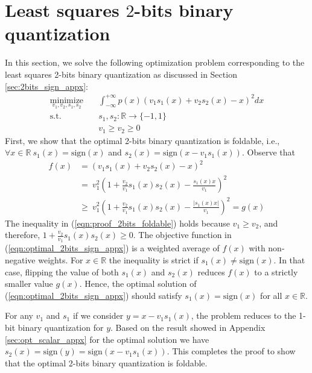 \documentclass[10pt,twocolumn,letterpaper]{article}
\newcommand{\R}{\mathbb{R}}
\begin{document}
\section{Least squares $2$-bits binary quantization} \label{sec:optimal_2bits}
In this section, we solve the following optimization problem corresponding to the least squares 2-bits binary quantization as discussed in Section \ref{sec:2bits_sign_appx}:
\begin{equation}\label{eqn:optimal_2bits_sign_appx}
\begin{aligned}
\underset{v_1,v_2, s_1,s_2}{\text{minimize}} \quad & \int_{-\infty}^{+\infty} p(x)\left(v_1 s_1(x) + v_2 s_2(x)  - x\right)^2 dx\\
\text{s.t.} \quad &s_1, s_2: \R \to \{-1,1\}\\
\quad & v_1 \ge v_2\ge 0
\end{aligned}
\end{equation}
First, we show that the optimal 2-bits binary quantization is foldable, i.e., $\forall x\in \R~ s_1(x) = \text{sign}(x)$ and $s_2(x) = \text{sign}(x - v_1s_1(x))$. Observe that
\begin{equation} \label{eqn:proof_2bits_foldable}
\begin{aligned}
f(x) &= \left(v_1 s_1(x) + v_2 s_2(x)  - x\right)^2\\ &=
~ v_1^2 \left(1 + \frac{v_2}{v_1} s_1(x) s_2(x)  - \frac{s_1(x)x}{v_1}\right)^2\\ &\ge
~ v_1^2 \left(1 + \frac{v_2}{v_1} s_1(x) s_2(x)  - \frac{|s_1(x)x|}{v_1}\right)^2  = g(x)
\end{aligned}
\end{equation}
The inequality in (\ref{eqn:proof_2bits_foldable}) holds because $v_1 \ge v_2$, and therefore, $1 + \frac{v_2}{v_1} s_1(x) s_2(x) \ge 0$. The objective function in (\ref{eqn:optimal_2bits_sign_appx}) is a weighted average of $f(x)$ with non-negative weights. For $x \in \R$ the inequality is strict if $s_1(x) \ne \text{sign}(x)$. In that case, flipping the value of both $s_1(x)$ and $s_2(x)$ reduces $f(x)$ to a strictly smaller value $g(x)$. Hence, the optimal solution of (\ref{eqn:optimal_2bits_sign_appx}) should satisfy $s_1(x) = \text{sign}(x)$ for all $x \in \R$.

For any $v_1$ and $s_1$ if we consider $y = x - v_1 s_1(x)$, the problem reduces to the 1-bit binary quantization for $y$. Based on the result showed in Appendix \ref{sec:opt_scalar_appx} for the optimal solution we have $s_2(x) = \text{sign}(y) = \text{sign}(x - v_1 s_1(x))$. This completes the proof to show that the optimal 2-bits binary quantization is foldable.
\end{document}
